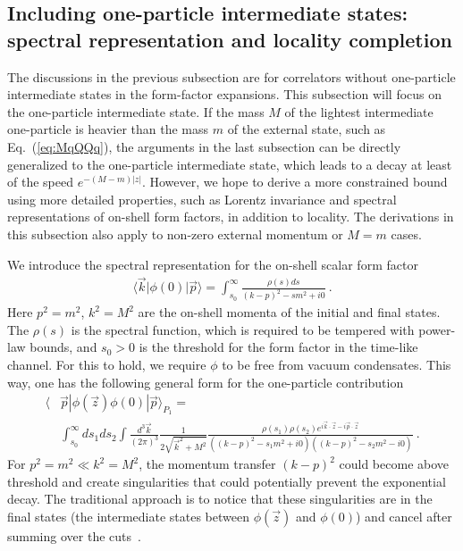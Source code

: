 \documentclass[a4paper,11pt]{article}
\begin{document}
\subsection{Including one-particle intermediate states: spectral representation and locality completion}
The discussions in the previous subsection are for correlators without one-particle intermediate states in the form-factor expansions. This subsection will focus on the one-particle intermediate state. If the mass $M$ of the lightest intermediate one-particle is heavier than the mass $m$ of the external state, such as Eq.~(\ref{eq:MqQQq}), the arguments in the last subsection can be directly generalized to the one-particle intermediate state, which leads to a decay at least of the speed $e^{-(M-m)|z|}$. However, we hope to derive a more constrained bound using more detailed properties, such as Lorentz invariance and spectral representations of on-shell form factors, in addition to locality. The derivations in this subsection also apply to non-zero external momentum or $M=m$ cases.

We introduce the spectral representation for the on-shell scalar form factor
\begin{align}
\langle \vec{k}|\phi(0)|\vec{p}\rangle=\int_{s_0}^{\infty}\frac{\rho(s)ds}{(k-p)^2-sm^2+i0} \ . 
\end{align}
Here $p^2=m^2$, $k^2=M^2$ are the on-shell momenta of the initial and final states. The $\rho(s)$ is the spectral function, which is required to be tempered with power-law bounds, and $s_0>0$ is the  threshold for the form factor in the time-like channel. For this to hold, we require $\phi$ to be free from vacuum condensates. This way, one has the following general form for the one-particle contribution
\begin{align}
\langle &\vec{p}|\phi(\vec{z})\phi(0)|\vec{p}\rangle\nonumber_{P_1}= \\ 
&\int_{s_0}^{\infty}  ds_1ds_2\int \frac{d^3\vec{k{}}}{(2\pi)^3}\frac{1}{2\sqrt{\vec{k}^2+M^2}}\frac{\rho(s_1)\rho(s_2)e^{i\vec{k}\cdot \vec{z}-i\vec{p}\cdot \vec{z}}}{((k-p)^2-s_1m^2+i0)((k-p)^2-s_2m^2-i0)} \ . \label{eq:onepform}
\end{align}
For $p^2=m^2\ll k^2=M^2$, the momentum transfer $(k-p)^2$
could become above threshold and create singularities that could potentially prevent the exponential decay. The traditional approach is to notice that these singularities are in the final states (the intermediate states between $\phi(\vec{z})$ and $\phi(0)$) and cancel after summing over the cuts~\cite{Collins_2023}. 
\end{document}
